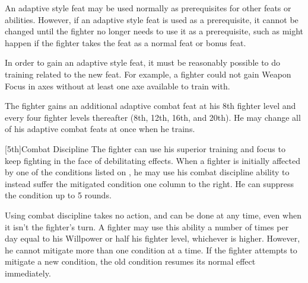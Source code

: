 \par An adaptive style feat may be used normally as prerequisites for other feats or abilities.
However, if an adaptive style feat is used as a prerequisite, it cannot be changed until the fighter no longer needs to use it as a prerequisite, such as might happen if the fighter takes the feat as a normal feat or bonus feat.

\par In order to gain an adaptive style feat, it must be reasonably possible to do training related to the new feat.
For example, a fighter could not gain Weapon Focus in axes without at least one axe available to train with.

The fighter gains an additional adaptive combat feat at his 8th fighter level and every four fighter levels thereafter (8th, 12th, 16th, and 20th).
He may change all of his adaptive combat feats at once when he trains.

[5th]{Combat Discipline}
The fighter can use his superior training and focus to keep fighting in the face of debilitating effects.
When a fighter is initially affected by one of the conditions listed on , he may use his combat discipline ability to instead suffer the mitigated condition one column to the right.
He can suppress the condition up to 5 rounds.

\par Using combat discipline takes no action, and can be done at any time, even when it isn't the fighter's turn.
A fighter may use this ability a number of times per day equal to his Willpower or half his fighter level, whichever is higher.
However, he cannot mitigate more than one condition at a time.
If the fighter attempts to mitigate a new condition, the old condition resumes its normal effect immediately.


